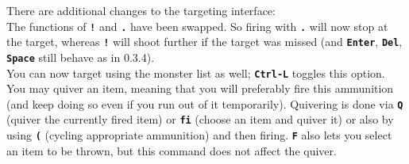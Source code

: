 \documentclass[a4paper,10pt]{article}
\newcommand{\key}[1]{{{\texttt{\textbf{#1}}}}} %
\begin{document}
There are additional changes to the targeting interface: \\
The functions of \key{!} and \key{.} have been swapped. So firing with
\key{.} will now stop at the target, whereas \key{!} will shoot further
if the target was missed (and \key{Enter}, \key{Del}, \key{Space} still
behave as in 0.3.4). \\
You can now target using the monster list as well; \key{Ctrl-L} toggles
this option.\\
You may quiver an item, meaning that you will preferably fire this
ammunition (and keep doing so even if you run out of it temporarily). 
Quivering is done via \key{Q} (quiver the currently fired item) or 
\key{fi} (choose an item and quiver it) or also by using \key{(} (cycling 
appropriate ammunition) and then firing. \key{F} also lets you select an 
item to be thrown, but this command does not affect the quiver.
\end{document}

